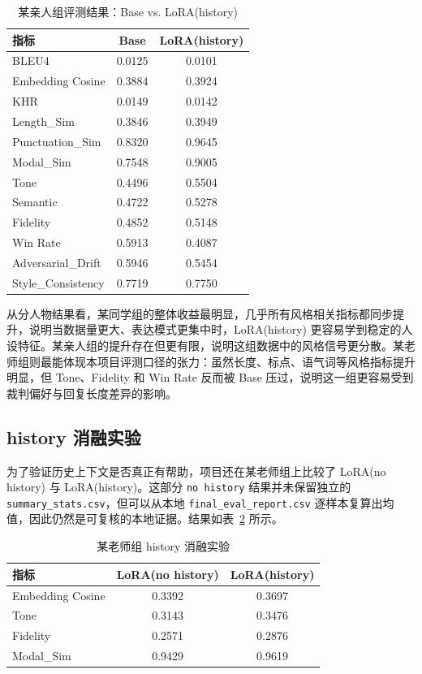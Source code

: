 \documentclass[12pt,a4paper]{ctexart}
\begin{document}
\begin{table}[H]
\centering
\caption{某亲人组评测结果：Base vs. LoRA(history)}
\label{tab:liupeilin-result}
\begin{tabular}{lcc}
\toprule
指标 & Base & LoRA(history) \\
\midrule
BLEU4 & 0.0125 & 0.0101 \\
Embedding Cosine & 0.3884 & 0.3924 \\
KHR & 0.0149 & 0.0142 \\
Length\_Sim & 0.3846 & 0.3949 \\
Punctuation\_Sim & 0.8320 & 0.9645 \\
Modal\_Sim & 0.7548 & 0.9005 \\
Tone & 0.4496 & 0.5504 \\
Semantic & 0.4722 & 0.5278 \\
Fidelity & 0.4852 & 0.5148 \\
Win Rate & 0.5913 & 0.4087 \\
Adversarial\_Drift & 0.5946 & 0.5454 \\
Style\_Consistency & 0.7719 & 0.7750 \\
\bottomrule
\end{tabular}
\end{table}

从分人物结果看，某同学组的整体收益最明显，几乎所有风格相关指标都同步提升，说明当数据量更大、表达模式更集中时，LoRA(history) 更容易学到稳定的人设特征。某亲人组的提升存在但更有限，说明这组数据中的风格信号更分散。某老师组则最能体现本项目评测口径的张力：虽然长度、标点、语气词等风格指标提升明显，但 Tone、Fidelity 和 Win Rate 反而被 Base 压过，说明这一组更容易受到裁判偏好与回复长度差异的影响。

\subsection{history 消融实验}

为了验证历史上下文是否真正有帮助，项目还在某老师组上比较了 LoRA(no history) 与 LoRA(history)。这部分 \texttt{no history} 结果并未保留独立的 \texttt{summary\_stats.csv}，但可以从本地 \texttt{final\_eval\_report.csv} 逐样本复算出均值，因此仍然是可复核的本地证据。结果如表~\ref{tab:ablation-history} 所示。

\begin{table}[H]
\centering
\caption{某老师组 history 消融实验}
\label{tab:ablation-history}
\begin{tabular}{lcc}
\toprule
指标 & LoRA(no history) & LoRA(history) \\
\midrule
Embedding Cosine & 0.3392 & 0.3697 \\
Tone & 0.3143 & 0.3476 \\
Fidelity & 0.2571 & 0.2876 \\
Modal\_Sim & 0.9429 & 0.9619 \\
\bottomrule
\end{tabular}
\end{table}
\end{document}
